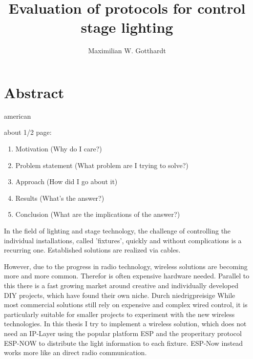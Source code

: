 \documentclass[]{ccs-thesis}
\author{Maximilian W. Gotthardt}
\title{Evaluation of protocols for control stage lighting}
\begin{document}

\maketitle

\thispagestyle{empty}

\cleardoublepage

\chapter*{Abstract}
\begin{otherlanguage*}{american}

about 1/2 page:
\begin{enumerate}
	\item Motivation (Why do I care?)
	\item Problem statement (What problem are I trying to solve?)
	\item Approach (How did I go about it)
	\item Results (What's the answer?)
	\item Conclusion (What are the implications of the answer?)
\end{enumerate}
	

In the field of lighting and stage technology, the challenge of controlling the individual installations, called 'fixtures', quickly and without complications is a recurring one. 
Established solutions are realized via cables. 

However, due to the progress in radio technology, wireless solutions are becoming more and more common. 
Therefor is often expensive hardware needed.
Parallel to this there is a fast growing market around creative and individually developed DIY projects, which have found their own niche. 
Durch niedrigpreisige 
While most commercial solutions still rely on expensive and complex wired control, it is particularly suitable for smaller projects to experiment with the new wireless technologies. 
In this thesis I try to implement a wireless solution, which does not need an IP-Layer using the popular platform ESP and the properitary protocol ESP-NOW to distribute the light information to each fixture. 
ESP-Now instead works more like an direct radio communication.
	
\end{otherlanguage*}
\end{document}
